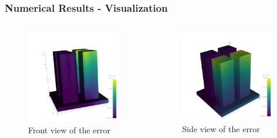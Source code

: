 \documentclass{beamer}
\begin{document}
\begin{frame}
    \frametitle{Numerical Results - Visualization}
    \begin{columns}
        \begin{figure}
            \centering
            \includegraphics[width=0.95\textwidth]{Images/error_vis_3_pass_10k_1.png}
            \caption{Front view of the error}
            \end{figure}
        \begin{figure}
            \centering
            \includegraphics[width=0.95\textwidth]{Images/error_vis_3_pass_10k_2.png}
            \caption{Side view of the error}
        \end{figure}
    \end{columns}
\end{frame}
\end{document}
